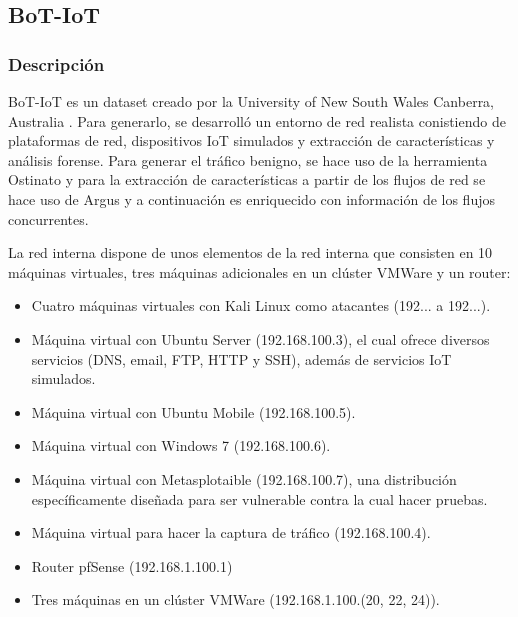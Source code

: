 
\subsection{BoT-IoT}

\subsubsection{Descripción}

BoT-IoT es un dataset creado por la University of New South Wales Canberra, Australia \cite{DBLP:journals/corr/abs-1811-00701}. Para generarlo, se desarrolló un entorno de red realista conistiendo de plataformas de red, dispositivos IoT simulados y extracción de características y análisis forense. Para generar el tráfico benigno, se hace uso de la herramienta Ostinato \cite{ostinato} y para la extracción de características a partir de los flujos de red se hace uso de Argus \cite{argustool} y a continuación es enriquecido con información de los flujos concurrentes.

La red interna dispone de unos elementos de la red interna que consisten en 10 máquinas virtuales, tres máquinas adicionales en un clúster VMWare y un router:

\begin{itemize}
    \item Cuatro máquinas virtuales con Kali Linux como atacantes (192... a 192...).
    \item Máquina virtual con Ubuntu Server (192.168.100.3), el cual ofrece diversos servicios (DNS, email, FTP, HTTP y SSH), además de servicios IoT simulados.
    \item Máquina virtual con Ubuntu Mobile (192.168.100.5).
    \item Máquina virtual con Windows 7 (192.168.100.6).
    \item Máquina virtual con Metasplotaible (192.168.100.7), una distribución específicamente diseñada para ser vulnerable contra la cual hacer pruebas.
    \item Máquina virtual para hacer la captura de tráfico (192.168.100.4).
    \item Router pfSense (192.168.1.100.1)
    \item Tres máquinas en un clúster VMWare (192.168.1.100.(20, 22, 24)).
\end{itemize}

